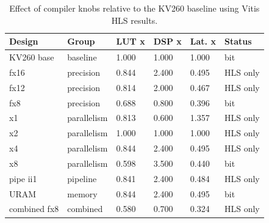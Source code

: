\begin{table}[t]
\centering
\scriptsize
\setlength{\tabcolsep}{3pt}
\begin{tabular}{llllll}
\hline
Design & Group & LUT x & DSP x & Lat. x & Status \\
\hline
KV260 base & baseline & 1.000 & 1.000 & 1.000 & bit \\
fx16 & precision & 0.844 & 2.400 & 0.495 & HLS only \\
fx12 & precision & 0.814 & 2.000 & 0.467 & HLS only \\
fx8 & precision & 0.688 & 0.800 & 0.396 & bit \\
x1 & parallelism & 0.813 & 0.600 & 1.357 & HLS only \\
x2 & parallelism & 1.000 & 1.000 & 1.000 & HLS only \\
x4 & parallelism & 0.844 & 2.400 & 0.495 & HLS only \\
x8 & parallelism & 0.598 & 3.500 & 0.440 & bit \\
pipe ii1 & pipeline & 0.841 & 2.400 & 0.484 & HLS only \\
URAM & memory & 0.844 & 2.400 & 0.495 & bit \\
combined fx8 & combined & 0.580 & 0.700 & 0.324 & HLS only \\
\hline
\end{tabular}
\caption{Effect of compiler knobs relative to the KV260 baseline using Vitis HLS results.}
\label{tab:table\_arxiv\_knob\_summary}
\end{table}
